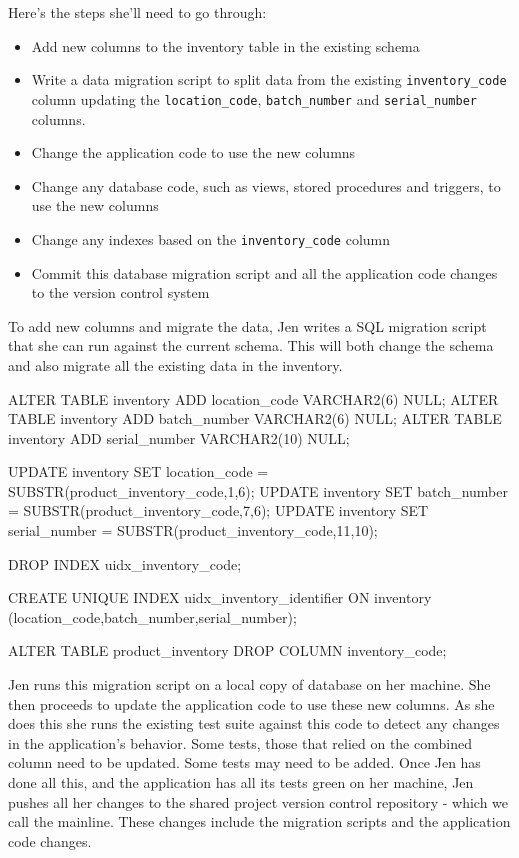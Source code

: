 \documentclass[12pt]{article}
\begin{document}
Here's the steps she'll need to go through:

\begin{itemize}
  \item Add new columns to the inventory table in the existing schema
  \item Write a data migration script to split data from the existing
    \verb=inventory_code= column updating the \verb=location_code=,
    \verb=batch_number= and \verb=serial_number= columns.
  \item Change the application code to use the new columns
  \item Change any database code, such as views, stored procedures and
    triggers, to use the new columns
  \item Change any indexes based on the \verb=inventory_code= column
  \item Commit this database migration script and all the application
    code changes to the version control system
\end{itemize}

To add new columns and migrate the data, Jen writes a SQL migration
script that she can run against the current schema. This will both
change the schema and also migrate all the existing data in the
inventory.

\begin{sqlcode}
ALTER TABLE inventory ADD location_code VARCHAR2(6) NULL;
ALTER TABLE inventory ADD batch_number VARCHAR2(6) NULL;
ALTER TABLE inventory ADD serial_number VARCHAR2(10) NULL;

UPDATE inventory SET location_code = SUBSTR(product_inventory_code,1,6);
UPDATE inventory SET batch_number = SUBSTR(product_inventory_code,7,6);
UPDATE inventory SET serial_number = SUBSTR(product_inventory_code,11,10);

DROP INDEX uidx_inventory_code;

CREATE UNIQUE INDEX uidx_inventory_identifier
  ON inventory (location_code,batch_number,serial_number);

ALTER TABLE product_inventory DROP COLUMN inventory_code;
\end{sqlcode}

Jen runs this migration script on a local copy of database on her
machine. She then proceeds to update the application code to use these
new columns. As she does this she runs the existing test suite against
this code to detect any changes in the application's behavior. Some
tests, those that relied on the combined column need to be updated. Some
tests may need to be added. Once Jen has done all this, and the
application has all its tests green on her machine, Jen pushes all her
changes to the shared project version control repository - which we call
the mainline. These changes include the migration scripts and the
application code changes.
\end{document}
